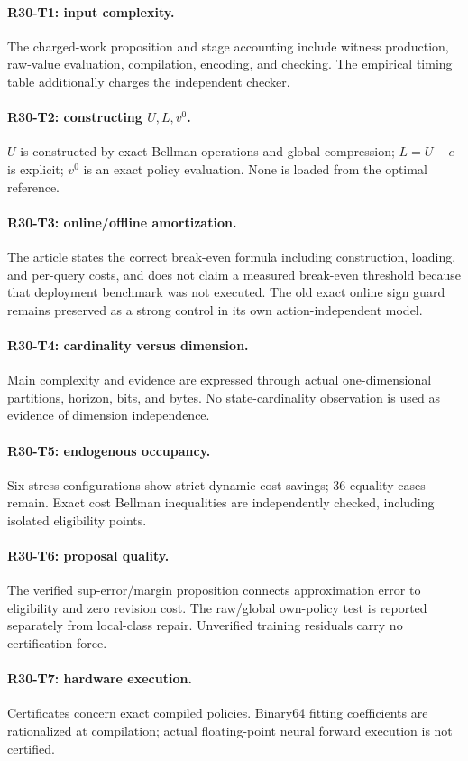 \paragraph{R30-T1: input complexity.} The charged-work proposition and stage accounting include witness production, raw-value evaluation, compilation, encoding, and checking. The empirical timing table additionally charges the independent checker.
\paragraph{R30-T2: constructing $U,L,v^0$.} $U$ is constructed by exact Bellman operations and global compression; $L=U-e$ is explicit; $v^0$ is an exact policy evaluation. None is loaded from the optimal reference.
\paragraph{R30-T3: online/offline amortization.} The article states the correct break-even formula including construction, loading, and per-query costs, and does not claim a measured break-even threshold because that deployment benchmark was not executed. The old exact online sign guard remains preserved as a strong control in its own action-independent model.
\paragraph{R30-T4: cardinality versus dimension.} Main complexity and evidence are expressed through actual one-dimensional partitions, horizon, bits, and bytes. No state-cardinality observation is used as evidence of dimension independence.
\paragraph{R30-T5: endogenous occupancy.} Six stress configurations show strict dynamic cost savings; 36 equality cases remain. Exact cost Bellman inequalities are independently checked, including isolated eligibility points.
\paragraph{R30-T6: proposal quality.} The verified sup-error/margin proposition connects approximation error to eligibility and zero revision cost. The raw/global own-policy test is reported separately from local-class repair. Unverified training residuals carry no certification force.
\paragraph{R30-T7: hardware execution.} Certificates concern exact compiled policies. Binary64 fitting coefficients are rationalized at compilation; actual floating-point neural forward execution is not certified.
